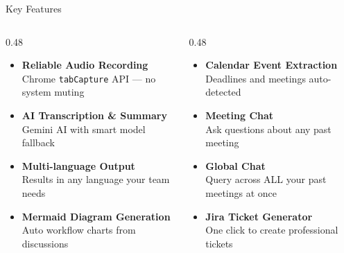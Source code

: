 \documentclass[aspectratio=169]{beamer}
\newcommand{\hl}[1]{\textcolor{accentlight}{\textbf{#1}}}
\begin{document}
\begin{frame}{Key Features}
  \begin{columns}[T]
    \begin{column}{0.48\textwidth}
      \begin{itemize}
        \item \hl{Reliable Audio Recording}\\
              \small Chrome \texttt{tabCapture} API --- no system muting
        \vspace{0.25cm}
        \item \hl{AI Transcription \& Summary}\\
              \small Gemini AI with smart model fallback
        \vspace{0.25cm}
        \item \hl{Multi-language Output}\\
              \small Results in any language your team needs
        \vspace{0.25cm}
        \item \hl{Mermaid Diagram Generation}\\
              \small Auto workflow charts from discussions
      \end{itemize}
    \end{column}
    \begin{column}{0.48\textwidth}
      \begin{itemize}
        \item \hl{Calendar Event Extraction}\\
              \small Deadlines and meetings auto-detected
        \vspace{0.25cm}
        \item \hl{Meeting Chat}\\
              \small Ask questions about any past meeting
        \vspace{0.25cm}
        \item \hl{Global Chat}\\
              \small Query across ALL your past meetings at once
        \vspace{0.25cm}
        \item \hl{Jira Ticket Generator}\\
              \small One click to create professional tickets
      \end{itemize}
    \end{column}
  \end{columns}
\end{frame}
\end{document}
